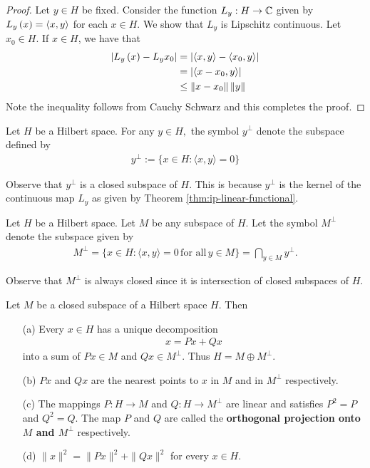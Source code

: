 \begin{proof}
    Let $y\in H$ be fixed. Consider the function $L_{y} : H \to \mathbb C$ given by $L_{y} \left( x \right) = \left\langle x,y \right\rangle$ for each $x \in H$. We show that $L_{y}$ is Lipschitz continuous.
    Let $x_0 \in H$. If $x\in H$, we have that
    \begin{align*}
	\left\lvert L_{y} \left( x \right) - L_{y} x_{0} \right\rvert &= \left\lvert \left\langle x,y \right\rangle-\left\langle x_{0},y \right\rangle \right\rvert	\\
	&= \left\lvert \left\langle x-x_{0},y \right\rangle \right\rvert \\
	& \le \left\lVert x-x_{0} \right\rVert \left\lVert y \right\rVert
    \end{align*}
    Note the inequality follows from Cauchy Schwarz and this completes the proof.
\end{proof}

\begin{definition}
    Let $H$ be a Hilbert space. For any $y\in H,$ the symbol $y^{\perp}$ denote the subspace defined by
\begin{align*}
    y^{\perp}:= \{x\in H : \langle x,y\rangle=0\}
    \label{def:orthonormal-of-subspace}
\end{align*}
\end{definition}

Observe that $y^{\perp}$ is a closed subspace of $H$. This is because $y^{\perp}$ is the kernel of the continuous map $L_{y}$ as given by Theorem \ref{thm:ip-linear-functional}.

\begin{definition}
    Let $H$ be a Hilbert space. Let $M$ be any subspace of $H$. Let the symbol $M^{\perp}$ denote the subspace given by 
   \begin{align*}
M^{\perp} = \{x\in H : \langle x,y\rangle =0\,\mbox{for all}\,y\in M\}= \bigcap_{y\in M} y^{\perp}.  \end{align*} 

\end{definition}

Observe that $M^{\perp}$ is always closed since it is intersection of closed subspaces of $H$.

\begin{theorem}
Let $M$ be a closed subspace of a Hilbert space $H.$ Then 
\begin{itemize}
\item [(a)] Every $x\in H$ has a unique decomposition 
\begin{align*}
x= Px + Qx
\end{align*}
into a sum of $Px\in M$ and $Qx\in M^{\perp}.$ Thus $H = M \oplus M^{\perp}.$
\item [(b)] $Px$ and $Qx$ are the nearest points to $x$ in $M$ and in $M^{\perp}$ respectively.

\item [(c)] The mappings $P: H \to M$ and $Q: H \to M^{\perp}$ are linear and satisfies $P^2=P$ and $Q^2=Q.$ The map $P$ and $Q$ are called the \textbf{orthogonal projection onto $M$ and $M^{\perp}$} respectively.

\item [(d)] $\|x\|^2= \|Px\|^2 + \|Qx\|^2$ for every $x\in H.$
\end{itemize}
\end{theorem}

